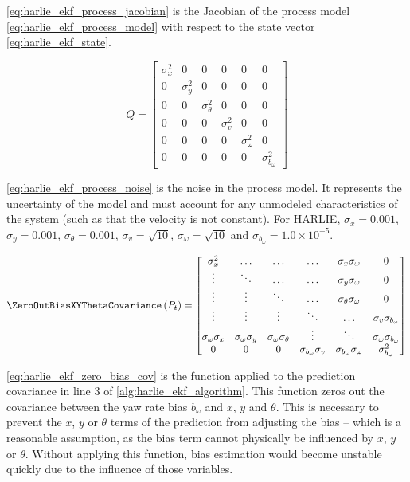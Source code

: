 \eqref{eq:harlie_ekf_process_jacobian} is the Jacobian of the process model \eqref{eq:harlie_ekf_process_model} with respect to the state vector \eqref{eq:harlie_ekf_state}.

\begin{equation}
	Q =
	\begin{bmatrix}
		\sigma_{x}^2 & 0 & 0 & 0 & 0 & 0 \\
		0 & \sigma_{y}^2 & 0 & 0 & 0 & 0 \\
		0 & 0 & \sigma_{\theta}^2 & 0 & 0 & 0 \\
		0 & 0 & 0 & \sigma_{v}^2 & 0 & 0 \\
		0 & 0 & 0 & 0 & \sigma_{\omega}^2 & 0 \\
		0 & 0 & 0 & 0 & 0 & \sigma_{b_{\omega}}^2
	\end{bmatrix}
	\label{eq:harlie_ekf_process_noise}
\end{equation}

\eqref{eq:harlie_ekf_process_noise} is the noise in the process model. It represents the uncertainty of the model and must account for any unmodeled characteristics of the system (such as that the velocity is not constant). For HARLIE, $\sigma_{x} = 0.001$, $\sigma_{y} = 0.001$, $\sigma_{\theta} = 0.001$, $\sigma_{v} = \sqrt{10}$, $\sigma_{\omega} = \sqrt{10}$ and $\sigma_{b_{\omega}} = 1.0\times 10^{-5}$.

\begin{equation}
	\mathsf{\ZeroOutBiasXYThetaCovariance}\left(P_t\right) = 
	\begin{bmatrix}
		\sigma_x^2 & \ldots & \ldots & \ldots & \sigma_x\sigma_\omega & 0 \\
		\vdots & \ddots & \ldots & \ldots & \sigma_y\sigma_\omega & 0 \\
		\vdots & \vdots & \ddots & \ldots & \sigma_\theta\sigma_\omega & 0 \\
		\vdots & \vdots & \vdots & \ddots & \ldots & \sigma_v\sigma_{b_{\omega}} \\
		\sigma_\omega\sigma_x & \sigma_\omega\sigma_y & \sigma_\omega\sigma_\theta & \vdots & \ddots & \sigma_\omega\sigma_{b_{\omega}} \\
		0 & 0 & 0 & \sigma_{b_{\omega}}\sigma_v & \sigma_{b_{\omega}}\sigma_\omega & \sigma_{b_{\omega}}^2
	\end{bmatrix}
	\label{eq:harlie_ekf_zero_bias_cov}
\end{equation}

\eqref{eq:harlie_ekf_zero_bias_cov} is the function applied to the prediction covariance in line 3 of \autoref{alg:harlie_ekf_algorithm}. This function zeros out the covariance between the yaw rate bias $b_{\omega}$ and $x$, $y$ and $\theta$. This is necessary to prevent the $x$, $y$ or $\theta$ terms of the prediction from adjusting the bias -- which is a reasonable assumption, as the bias term cannot physically be influenced by $x$, $y$ or $\theta$. Without applying this function, bias estimation would become unstable quickly due to the influence of those variables.

